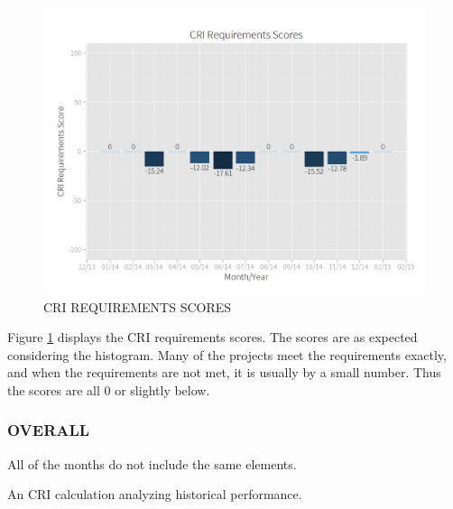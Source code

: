 \documentclass[SDSUThesis.tex]{subfiles}
\begin{document}
            \begin{figure}[ht]
                \centering
                \includegraphics[scale=.3]{images/requirements_scores.png}
                \caption{CRI REQUIREMENTS SCORES}
                \label{fig:requirements-scores}
            \end{figure}
            
            Figure \ref{fig:requirements-scores} displays the CRI requirements
            scores. The scores are as expected considering the histogram. Many
            of the projects meet the requirements exactly, and when the requirements
            are not met, it is usually by a small number.
            Thus the scores are all 0 or slightly below.
            
        \subsubsection{OVERALL}
            All of the months do not include the same elements.  
    
    An CRI calculation analyzing historical performance.


\end{document}
